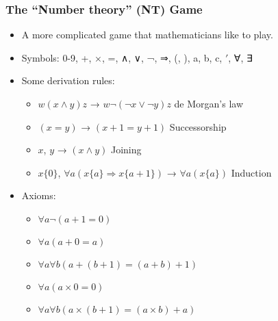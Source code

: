 \documentclass[mathserif]{beamer}
\begin{document}
\begin{frame}
\frametitle{The ``Number theory'' (NT) Game}
\label{sec-2-4}

\pause
\begin{itemize}

\item A more complicated game that mathematicians like to play.\pause\\
\label{sec-2-4-1}%
\item Symbols: 0-9, +, ×, =, ∧, ∨, ¬, ⇒, (, ), a, b, c, $\prime$, ∀, ∃\pause\\
\label{sec-2-4-2}%
\item Some derivation rules:\pause
\label{sec-2-4-3}%
\begin{itemize}

\item $w(x ∧ y)z$ → $w¬(¬x ∨ ¬y)z$ \hfill de Morgan's law\pause\\
\label{sec-2-4-3-1}%
\item $(x = y)$ → $(x+1 = y+1)$ \hfill Successorship\pause\\
\label{sec-2-4-3-2}%
\item $x$, $y$ → $(x ∧ y)$ \hfill Joining\pause\\
\label{sec-2-4-3-3}%
\item $x\{0\}$, $∀a (x\{a\} ⇒ x\{a+1\})$ → $∀a (x\{a\})$ \hfill Induction\pause\\
\label{sec-2-4-3-4}%
\end{itemize} %

\item Axioms:\pause
\label{sec-2-4-4}%
\begin{itemize}

\item $∀a ¬(a+1 = 0)$ \pause\\
\label{sec-2-4-4-1}%
\item $∀a (a+0 = a)$ \pause\\
\label{sec-2-4-4-2}%
\item $∀a∀b (a + (b+1) = (a+b) + 1)$ \pause\\
\label{sec-2-4-4-3}%
\item $∀a (a×0 = 0)$ \pause\\
\label{sec-2-4-4-4}%
\item $∀a∀b (a × (b+1) = (a×b) + a)$\\
\label{sec-2-4-4-5}%
\end{itemize} %
\end{itemize} %
\end{frame}
\end{document}
